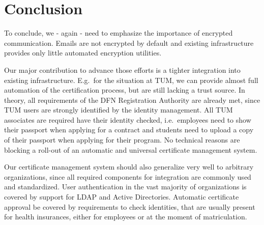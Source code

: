 \begin{abstract}
    
\end{abstract}

\begin{otherlanguage}{ngerman}
    \begin{abstract}
        
    \end{abstract}
\end{otherlanguage}

\setcounter{tocdepth}{1}
\tableofcontents
\listoffigures

\startcontent











\chapter{Conclusion}\label{ch:conclusion}
To conclude, we - again - need to emphasize the importance of encrypted communication.
Emails are not encrypted by default and existing infrastructure provides only little automated encryption utilities.

Our major contribution to advance those efforts is a tighter integration into existing infrastructure.
E.g.\ for the situation at TUM, we can provide almost full automation of the certification process, but are still
lacking a trust source.
In theory, all requirements of the DFN Registration Authority are already met, since TUM users are strongly identified
by the identity management.
All TUM associates are required have their identity checked, i.e.\ employees need to show their passport when applying
for a contract and students need to upload a copy of their passport when applying for their program.
No technical reasons are blocking a roll-out of an automatic and universal certificate management system.

Our certificate management system should also generalize very well to arbitrary organizations, since all required
components for integration are commonly used and standardized.
User authentication in the vast majority of organizations is covered by support for LDAP and Active Directories.
Automatic certificate approval be covered by requirements to check identities, that are usually present for health
insurances, either for employees or at the moment of matriculation.

